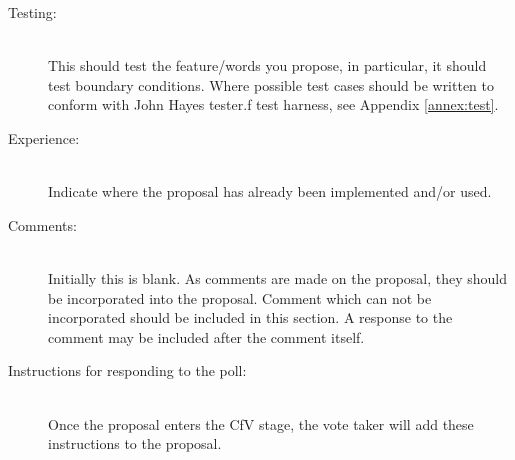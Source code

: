 \begin{description}
\item[Testing:] ~\\
	This should test the feature/words you propose, in particular, it
	should test boundary conditions.  Where possible test cases should
	be written to conform with John Hayes tester.f test harness, see
	Appendix \ref{annex:test}.

\item[Experience:] ~\\
	Indicate where the proposal has already been implemented and/or
	used.

\item[Comments:] ~\\
	Initially this is blank.  As comments are made on the proposal,
	they should be incorporated into the proposal.  Comment which can
	not be incorporated should be included in this section.  A response
	to the comment may be included after the comment itself.

\item[Instructions for responding to the poll:] ~\\
	Once the proposal enters the CfV stage, the vote taker will add
	these instructions to the proposal.
\end{description}
\cbend
